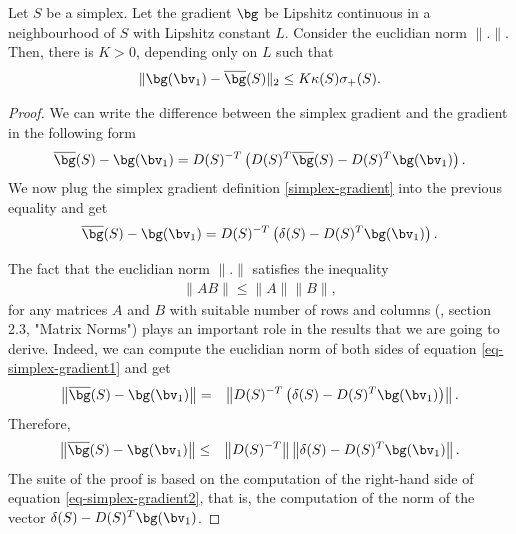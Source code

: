 \begin{proposition}
Let $S$ be a simplex. Let the gradient $\bg$ be Lipshitz continuous in a neighbourhood
of $S$ with Lipshitz constant $L$. Consider the euclidian norm $\|.\|$. Then, there is $K>0$,
depending only on $L$ such that 
\begin{eqnarray}
\label{eq-inequality-simplexgradient}
\| \bg(\bv_1) - \overline{\bg}(S) \|_2 \leq K \kappa(S) \sigma_+(S).
\end{eqnarray}
\end{proposition}

\begin{proof}
We can write the difference between the simplex 
gradient and the gradient in the following form
\begin{eqnarray}
\overline{\bg}(S) - \bg(\bv_1) = D(S)^{-T} \left( D(S)^T \overline{\bg}(S) - D(S)^T \bg(\bv_1) \right).
\end{eqnarray}
We now plug the simplex gradient definition \ref{simplex-gradient} 
into the previous equality and get
\begin{eqnarray}
\label{eq-simplex-gradient1}
\overline{\bg}(S) - \bg(\bv_1) = D(S)^{-T} \left( \delta(S) - D(S)^T \bg(\bv_1) \right).
\end{eqnarray}

The fact that the euclidian norm $\|.\|$ satisfies the 
inequality 
\begin{eqnarray}
\| A B \| \leq \|A\|\|B\|,
\end{eqnarray}
for any matrices $A$ and $B$ with suitable number of rows 
and columns (\cite{citeulike:2122238}, section 2.3, "Matrix Norms") 
plays an important role in the results that we are going to derive.
Indeed, we can compute the euclidian norm of both sides 
of equation \ref{eq-simplex-gradient1} and get
\begin{eqnarray}
\left\| \overline{\bg}(S) - \bg(\bv_1) \right\| 
&=& \left\| D(S)^{-T} \left( \delta(S) - D(S)^T \bg(\bv_1) \right) \right\|.
\end{eqnarray}
Therefore, 
\begin{eqnarray}
\label{eq-simplex-gradient2}
\left\| \overline{\bg}(S) - \bg(\bv_1) \right\| 
&\leq& \left\| D(S)^{-T} \right\| \left\| \delta(S) - D(S)^T \bg(\bv_1) \right\|.
\end{eqnarray}
The suite of the proof is based on the computation of the right-hand side 
of equation \ref{eq-simplex-gradient2}, that is, the computation of the norm
of the vector $\delta(S) - D(S)^T \bg(\bv_1)$.


\end{proof}
